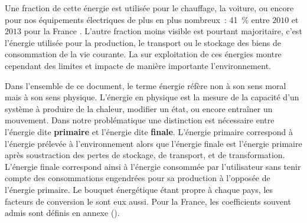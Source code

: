 Une fraction de cette énergie est utilisée pour le chauffage, la voiture, ou encore pour
nos équipements électriques de plus en plus nombreux~: \SI{+41}{\percent}
entre $2010$ et $2013$ pour la France \textcite{ADEME2015}. L’autre fraction moins visible est
pourtant majoritaire, c’est l’énergie utilisée pour la production, le transport ou le
stockage des biens de consommation de la vie courante.
La sur exploitation de ces énergies montre cependant des limites et impacte de manière
importante l’environnement.

\begin{Def}[Énergie]\label{def:energie}
Dans l’ensemble de ce document, le terme énergie réfère non à son sens moral mais à son
sens physique. L’énergie en physique est la mesure de la capacité d’un système à produire
de la chaleur, modifier un état, ou encore entraîner un mouvement. Dans notre
problématique une distinction est nécessaire entre l’énergie dite \textbf{primaire} et
l’énergie dite \textbf{finale}. L’énergie primaire correspond à l’énergie prélevée à
l’environnement alors que l’énergie finale est l’énergie primaire après soustraction des
pertes de stockage, de transport, et de transformation. L’énergie finale correspond ainsi
à l’énergie consommée par l’utilisateur sans tenir compte des consommations engendrées pour sa
production à l’opposée de l’énergie primaire. Le bouquet énergétique étant propre à chaque
pays, les facteurs de conversion le sont eux aussi. Pour la France,
les coefficients souvent admis sont définis en annexe ().
\end{Def}

